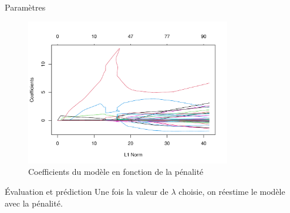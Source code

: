 \documentclass[
  ignorenonframetext,
]{beamer}
\newenvironment{Shaded}{\begin{snugshade}}{\end{snugshade}}
\newcommand{\AttributeTok}[1]{\textcolor[rgb]{0.40,0.45,0.13}{#1}}
\newcommand{\CommentTok}[1]{\textcolor[rgb]{0.37,0.37,0.37}{#1}}
\newcommand{\DecValTok}[1]{\textcolor[rgb]{0.68,0.00,0.00}{#1}}
\newcommand{\FunctionTok}[1]{\textcolor[rgb]{0.28,0.35,0.67}{#1}}
\newcommand{\NormalTok}[1]{\textcolor[rgb]{0.00,0.23,0.31}{#1}}
\newcommand{\OtherTok}[1]{\textcolor[rgb]{0.00,0.23,0.31}{#1}}
\newcommand{\SpecialCharTok}[1]{\textcolor[rgb]{0.37,0.37,0.37}{#1}}
\begin{document}
\begin{frame}{Paramètres}
\protect\hypertarget{paramuxe8tres}{}
\begin{figure}

{\centering \includegraphics[width=0.8\textwidth,height=\textheight]{MATH60602-diapos4_files/figure-beamer/fig-lassopath-1.pdf}

}

\caption{\label{fig-lassopath}Coefficients du modèle en fonction de la
pénalité}

\end{figure}
\end{frame}

\begin{frame}[fragile]{Évaluation et prédiction}
\protect\hypertarget{uxe9valuation-et-pruxe9diction}{}
Une fois la valeur de \(\lambda\) choisie, on réestime le modèle avec la
pénalité.

\begin{Shaded}
\end{Shaded}
\end{frame}
\end{document}
